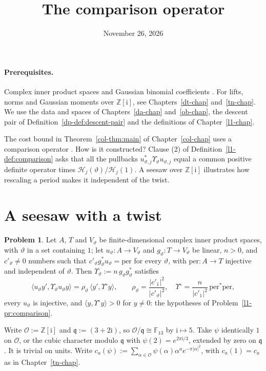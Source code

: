 \documentclass[reqno]{amsart}
\title{The comparison operator}
\author{}
\date{November 26, 2026}
\newcounter{chap}
\theoremstyle{definition}
\newtheorem{problem}{Problem}[section]
\theoremstyle{plain}
\theoremstyle{remark}
\newcommand{\Z}{{\mathbb{Z}}}
\newcommand{\F}{{\mathbb{F}}}
\newcommand{\Oc}{{\mathcal{O}}}
\newcommand{\Hc}{{\mathcal{H}}}
\newcommand{\ii}{\mathrm{i}}
\newcommand{\per}{\mathrm{per}}
\newcommand{\vt}{\vartheta}
\begin{document}
\maketitle
{}\label{chap}

\paragraph{Prerequisites.}
Complex inner product spaces and Gaussian binomial coefficients \cite[Ch.~1]{St}.  For lifts, norms and Gaussian moments over \(\Z[\ii]\), see Chapters~\ref{dt-chap} and~\ref{tn-chap}.  We use the data and spaces of Chapters~\ref{da-chap} and~\ref{ob-chap}, the descent pair of Definition~\ref{dp-def:descent-pair} and the definitions of Chapter~\ref{l1-chap}.

\medskip
The cost bound in Theorem~\ref{col-thm:main} of Chapter~\ref{col-chap} uses a comparison operator \cite[LiftVolumeHeight, line 729]{GL}.  How is it constructed?  Clause (2) of Definition~\ref{l1-def:comparison} asks that all the pullbacks \(u_{\vt,j}^*\Upsilon_\vt u_{\vt,j}\) equal a common positive definite operator times \(\Hc_j(\vt)/\Hc_j(1)\).  A seesaw over \(\Z[\ii]\) illustrates how rescaling a period makes it independent of the twist.

\section{A seesaw with a twist}\label{sec:toy}

\begin{problem}\label{pr:scalar}
Let \(A\), \(T\) and \(V_\vt\) be finite-dimensional complex inner product spaces, with \(\vt\) in a set containing \(1\); let \(u_\vt\colon A\to V_\vt\) and \(g_\vt\colon T\to V_\vt\) be linear, \(n>0\), and \(c'_\vt\ne0\) numbers such that \(c'_\vt g_\vt^*u_\vt = \per\) for every \(\vt\), with \(\per\colon A\to T\) injective and independent of \(\vt\).  Then \(\Upsilon_\vt := n\,g_\vt g_\vt^*\) satisfies
\[
  \langle u_\vt y', \Upsilon_\vt u_\vt y\rangle = \rho_\vt\,\langle y', \Upsilon^\circ y\rangle,
  \qquad \rho_\vt = \frac{\lvert c'_1\rvert^2}{\lvert c'_\vt\rvert^2},\quad \Upsilon^\circ = \frac{n}{\lvert c'_1\rvert^2}\,\per^*\per ,
\]
every \(u_\vt\) is injective, and \(\langle y,\Upsilon^\circ y\rangle>0\) for \(y\ne0\): the hypotheses of Problem~\ref{l1-pr:comparison}.
\end{problem}

Write \(\Oc:=\Z[\ii]\) and \(\mathfrak q:=(3+2\ii)\), so \(\Oc/\mathfrak q\cong\F_{13}\) by \(\ii\mapsto5\).  Take \(\psi\) identically \(1\) on \(\Oc\), or the cubic character modulo \(\mathfrak q\) with \(\psi(2)=e^{2\pi\ii/3}\), extended by zero on \(\mathfrak q\).  It is trivial on units.  Write \(c_a(\psi):=\sum_{\alpha\in\Oc}\psi(\alpha)\alpha^a e^{-\pi|\alpha|^2}\), with \(c_a(1)=c_a\) as in Chapter~\ref{tn-chap}.
\end{document}
